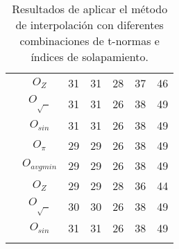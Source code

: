 \begin{longtable}{| c | c | c | c | c | c | c |}
&$O_{Z}$ &31 &31 &28 &37 &46 \\ \cline{2-7}
&$O_{\sqrt{\text{ }}}$ &31 &31 &26 &38 &49 \\ \cline{2-7}
&$O_{sin}$ &31 &31 &26 &38 &49 \\ \hhline{|=|=|=|=|=|=|=|}
\multirow{5}{*}{$T_{einstein}$}&$O_{\pi}$ &29 &29 &26 &38 &49 \\ \cline{2-7}
&$O_{avgmin}$ &29 &29 &26 &38 &49 \\ \cline{2-7}
&$O_{Z}$ &29 &29 &28 &36 &44 \\ \cline{2-7}
&$O_{\sqrt{\text{ }}}$ &30 &30 &26 &38 &49 \\ \cline{2-7}
&$O_{sin}$ &31 &31 &26 &38 &49 \\ \hline
\caption{Resultados de aplicar el método de interpolación con diferentes combinaciones de t-normas e índices de solapamiento.}
\label{tab:fire-detection-interpolation-comparison}
\end{longtable}
